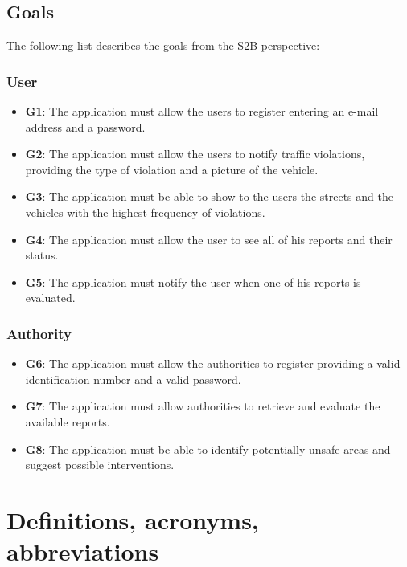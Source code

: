 \documentclass[12pt,a4paper]{report}
\begin{document}
	\subsection{Goals}
	The following list describes the goals from the S2B perspective:
		\subsubsection{User}
	\begin{itemize}
		\item \textbf{G1}: The application must allow the users to register entering an e-mail address and a password.
		\item \textbf{G2}: The application must allow the users to notify traffic violations, providing  the type of violation and a picture of the vehicle.
		\item \textbf{G3}: The application must be able to show to the users the streets and the vehicles with the highest frequency of violations.
		\item \textbf{G4}: The application must allow the user to see all of his reports and their status.
		\item \textbf{G5}: The application must notify the user when one of his reports is evaluated.
	\end{itemize}
		\subsubsection{Authority}
	\begin{itemize}
		\item \textbf{G6}: The application must allow the authorities to register providing a valid identification number and a valid password.
	  	\item \textbf{G7}: The application must allow authorities to retrieve and evaluate the available reports.
		\item \textbf{G8}: The application must be able to identify potentially unsafe areas and suggest possible interventions.
	\end{itemize}
	

	\section{Definitions, acronyms, abbreviations}
\end{document}
